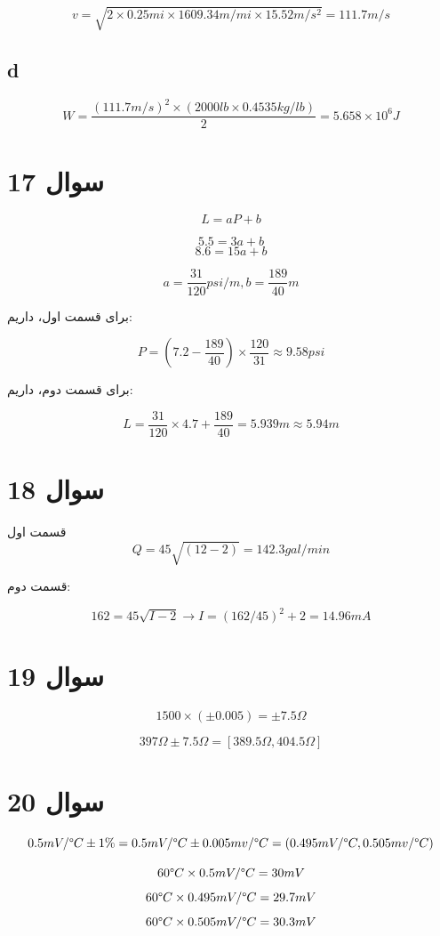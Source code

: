 \documentclass[12pt]{article}
\begin{document}
$$v = \sqrt{2 \times 0.25 mi \times 1609.34 m/mi \times 15.52 m/s^2} = 111.7 m/s$$
\subsection*{d}

$$W = \frac{( 111.7 m/s)^2 \times (2000 lb \times 0.4535 kg/lb)}{2} = 5.658 \times 10^6 J$$


\section*{سوال 17}

$$L = a P + b$$

$$5.5 = 3a+b  $$
$$8.6 = 15a + b$$


$$a = \frac{31}{120} psi/m , b= \frac{189}{40} m$$

برای قسمت اول، داریم:

$$P  = (7.2 - \frac{189}{40}) \times \frac{120}{31} \approx 9.58 psi $$

برای قسمت دوم، داریم:

$$L =\frac{31}{120} \times 4.7 + \frac{189}{40} =5.939 m \approx 5.94 m $$


\section*{سوال 18}

قسمت اول
$$Q = 45 \sqrt{(12 - 2)} =142.3 gal/min $$


قسمت دوم:

$$162 = 45 \sqrt{I -2} \rightarrow I = (162/45)^2 + 2 = 14.96 mA$$



\section*{سوال 19}

$$1500 \times (\pm 0.005) = \pm 7.5 \Omega$$

$$397 \Omega \pm 7.5 \Omega = [389.5\Omega , 404.5\Omega]$$


\section*{سوال 20}

$$0.5 mV/\degree C \pm 1\% = 0.5 mV/\degree C \pm 0.005 mv/\degree C  = (0.495 mV/\degree C , 0.505 mv/\degree C)$$

$$60 \degree C \times 0.5 mV/\degree C = 30 mV$$
$$60 \degree C \times 0.495 mV/\degree C = 29.7 mV$$
$$60 \degree C \times 0.505 mV/\degree C = 30.3 mV$$
\end{document}
